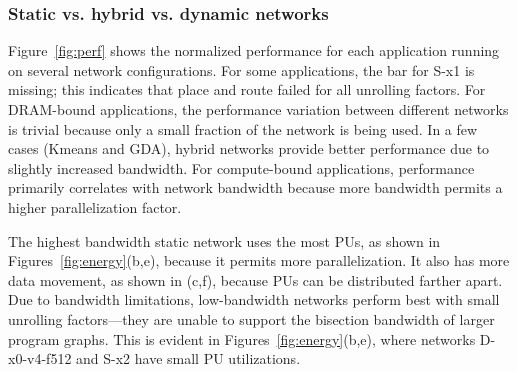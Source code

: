 
\subsubsection{Static vs. hybrid vs. dynamic networks}

Figure~\ref{fig:perf} shows the normalized performance for each application running on several network configurations.
For some applications, the bar for S-x1 is missing; this indicates that place and route failed for all unrolling factors.
For DRAM-bound applications, the performance variation between different networks is trivial because only a small fraction of the network is being used. 
In a few cases (Kmeans and GDA), hybrid networks  provide better performance due to slightly increased bandwidth.
For compute-bound applications, performance primarily correlates with network bandwidth because more bandwidth permits a higher parallelization factor. 

The highest bandwidth static network uses the most PUs, as shown in Figures~\ref{fig:energy}(b,e), because it permits more parallelization. 
It also has more data movement, as shown in (c,f), because PUs can be distributed farther apart. 
Due to bandwidth limitations, low-bandwidth networks perform best with small unrolling factors---they are unable to support the bisection bandwidth of larger program graphs.
This is evident in Figures~\ref{fig:energy}(b,e), where networks D-x0-v4-f512 and S-x2 have small PU utilizations.

